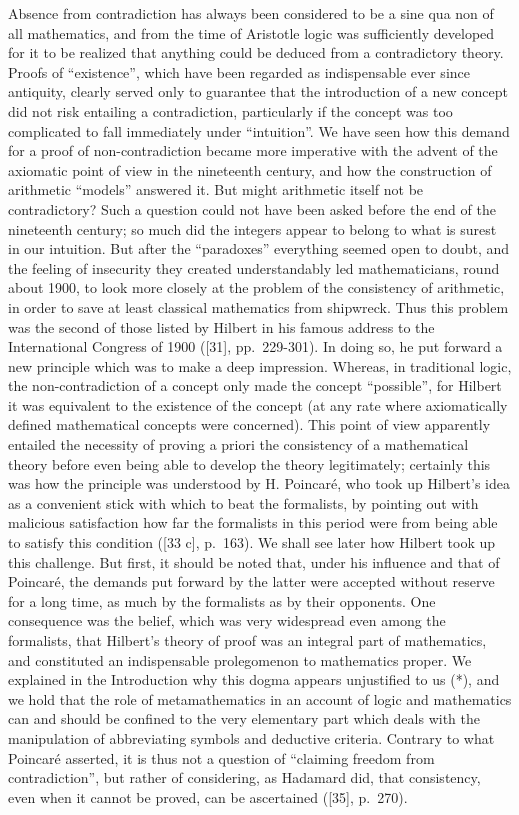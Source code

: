 Absence from contradiction has always been considered to be a sine qua non of all mathematics, and from the time of Aristotle logic was sufficiently developed for it to be realized that anything could be deduced from a contradictory theory. Proofs of ``existence'', which have been regarded as indispensable ever since antiquity, clearly served only to guarantee that the introduction of a new concept did not risk entailing a contradiction, particularly if the concept was too complicated to fall immediately under ``intuition''. We have seen how this demand for a proof of non-contradiction became more imperative with the advent of the axiomatic point of view in the nineteenth century, and how the construction of arithmetic ``models'' answered it. But might arithmetic itself not be contradictory? Such a question could not have been asked before the end of the nineteenth century; so much did the integers appear to belong to what is surest in our intuition. But after the ``paradoxes'' everything seemed open to doubt, and the feeling of insecurity they created understandably led mathematicians, round about 1900, to look more closely at the problem of the consistency of arithmetic, in order to save at least classical mathematics from shipwreck. Thus this problem was the second of those listed by Hilbert in his famous address to the International Congress of 1900 ({[}31{]}, pp.~229-301). In doing so, he put forward a new principle which was to make a deep impression. Whereas, in traditional logic, the non-contradiction of a concept only made the concept ``possible'', for Hilbert it was equivalent to the existence of the concept (at any rate where axiomatically defined mathematical concepts were concerned). This point of view apparently entailed the necessity of proving a priori the consistency of a mathematical theory before even being able to develop the theory legitimately; certainly this was how the principle was understood by H. Poincaré, who took up Hilbert's idea as a convenient stick with which to beat the formalists, by pointing out with malicious satisfaction how far the formalists in this period were from being able to satisfy this condition ({[}33 c{]}, p.~163). We shall see later how Hilbert took up this challenge. But first, it should be noted that, under his influence and that of Poincaré, the demands put forward by the latter were accepted without reserve for a long time, as much by the formalists as by their opponents. One consequence was the belief, which was very widespread even among the formalists, that Hilbert's theory of proof was an integral part of mathematics, and constituted an indispensable prolegomenon to mathematics proper. We explained in the Introduction why this dogma appears unjustified to us (*), and we hold that the role of metamathematics in an account of logic and mathematics can and should be confined to the very elementary part which deals with the manipulation of abbreviating symbols and deductive criteria. Contrary to what Poincaré asserted, it is thus not a question of ``claiming freedom from contradiction'', but rather of considering, as Hadamard did, that consistency, even when it cannot be proved, can be ascertained ({[}35{]}, p.~270).

